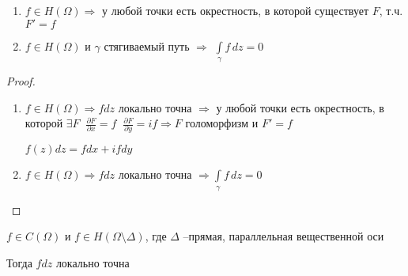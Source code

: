 
\begin{consequence}\thmslashn
	
	\begin{enumerate}
		\item 
		$f \in H(\Omega) \Rightarrow$ у любой точки есть окрестность, в которой существует $F$, т.ч. $F' = f$
		
		\item
		$f \in H(\Omega)$ и $\gamma$ стягиваемый путь $\Rightarrow$ $\int\limits_{\gamma} f\,dz = 0$
		
	\end{enumerate}
	
\end{consequence}

\begin{proof}\thmslashn
	
	\begin{enumerate}
		\item 
		$f \in H(\Omega) \Rightarrow fdz$ локально точна $\Rightarrow$ у любой точки есть окрестность, в которой $\exists F \;\; \frac{\partial F}{\partial x} = f \;\;\frac{\partial F}{\partial y} = if \Rightarrow F$ голоморфизм и $F' = f$
		
		$f(z)dz = fdx + ifdy$
		
		\item
		$f\in H(\Omega) \Rightarrow fdz$ локально точна  $\Rightarrow \int\limits_{\gamma} f\,dz = 0$ 
	\end{enumerate}
	
\end{proof}

\begin{theorem}\thmslashn
	
	$f\in C(\Omega)$ и $f \in H(\Omega \setminus \Delta)$, где $\Delta$ --прямая, параллельная вещественной оси
	
	Тогда $fdz$ локально точна
	
\end{theorem}


